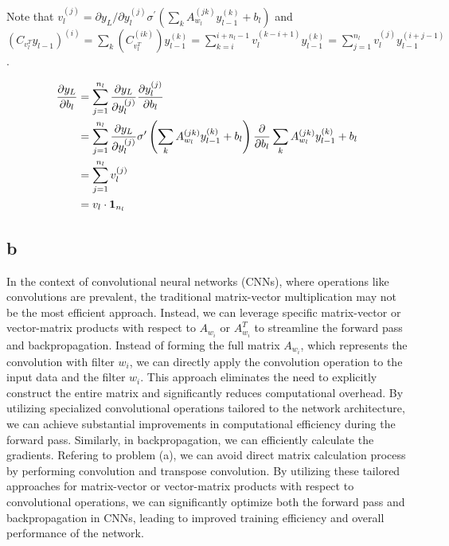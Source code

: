 \documentclass[10pt]{article}
\begin{document}
Note that $v_l^{(j)} = {\partial y_L/\partial y_l^{(j)}}\sigma^{\prime}\left(\sum_k A_{w_l}^{(jk)}y_{l-1}^{(k)} + b_l\right)$ and $\left(C_{v_l^T}y_{l-1}\right)^{(i)} = \sum_k \left(C_{v_l^T}^{(ik)}\right)y_{l-1}^{(k)} = \sum_{k=i}^{i+n_l-1}v_l^{(k-i+1)}y_{l-1}^{(k)} = \sum_{j=1}^{n_l}v_l^{(j)}y_{l-1}^{(i+j-1)}$.

\begin{align*}
    {\partial y_L \over \partial b_l} &= \sum_{j=1}^{n_l}{\partial y_L\over \partial y_l^{(j)}}{\partial y_l^{(j)}\over \partial b_l}  \\ 
    &= \sum_{j=1}^{n_l}{\partial y_L \over \partial y_l^{(j)}}\sigma^{\prime}\left(\sum_k A_{w_l}^{(jk)}y_{l-1}^{(k)} + b_l\right) {\partial \over \partial b_l} \sum_k A_{w_l}^{(jk)}y_{l-1}^{(k)} + b_l \\
    &= \sum_{j=1}^{n_l}v_l^{(j)}\\
    &= v_l \cdot \mathbf{1}_{n_l}
\end{align*}
\subsection*{b}
In the context of convolutional neural networks (CNNs), where operations like convolutions are prevalent, the traditional matrix-vector multiplication may not be the most efficient approach. 
Instead, we can leverage specific matrix-vector or vector-matrix products with respect to $A_{w_i}$ or $A^T_{w_i}$ to streamline the forward pass and backpropagation.
Instead of forming the full matrix $A_{w_i}$, which represents the convolution with filter $w_i$, we can directly apply the convolution operation to the input data and the filter $w_i$. 
This approach eliminates the need to explicitly construct the entire matrix and significantly reduces computational overhead.
By utilizing specialized convolutional operations tailored to the network architecture, we can achieve substantial improvements in computational efficiency during the forward pass.
Similarly, in backpropagation, we can efficiently calculate the gradients.
Refering to problem (a), we can avoid direct matrix calculation process by performing convolution and transpose convolution.
By utilizing these tailored approaches for matrix-vector or vector-matrix products with respect to convolutional operations, we can significantly optimize both the forward pass and backpropagation in CNNs, leading to improved training efficiency and overall performance of the network.
\end{document}
